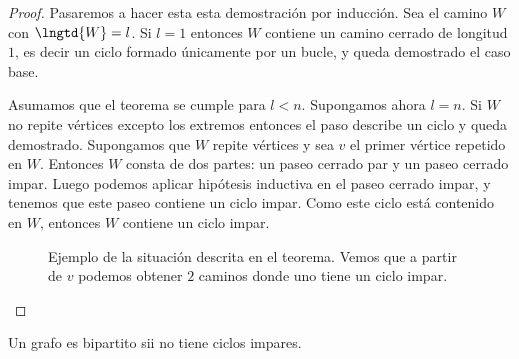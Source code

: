 \begin{proof}
    Pasaremos a hacer esta esta demostración por inducción. Sea el camino $W$ con $\lngtd{W} = l$. Si $l = 1$ entonces $W$ contiene un camino cerrado de longitud $1$, es decir un ciclo formado únicamente por un bucle, y queda demostrado el caso base.
    
    Asumamos que el teorema se cumple para $l < n$. Supongamos ahora $l = n$. Si $W$ no repite vértices excepto los extremos entonces el paso describe un ciclo y queda demostrado. Supongamos que $W$ repite vértices y sea $v$ el primer vértice repetido en $W$. Entonces $W$ consta de dos partes: un paseo cerrado par y un paseo cerrado impar. Luego podemos aplicar hipótesis inductiva en el paseo cerrado impar, y tenemos que este paseo contiene un ciclo impar. Como este ciclo está contenido en $W$, entonces $W$ contiene un ciclo impar.
    
    \begin{figure}
        \centering
        \caption{Ejemplo de la situación descrita en el teorema. Vemos que a partir de $v$ podemos obtener $2$ caminos donde uno tiene un ciclo impar.}
    \end{figure}
\end{proof}

\begin{teo}\label{teo:konig}
    Un grafo es bipartito sii no tiene ciclos impares.
\end{teo}


